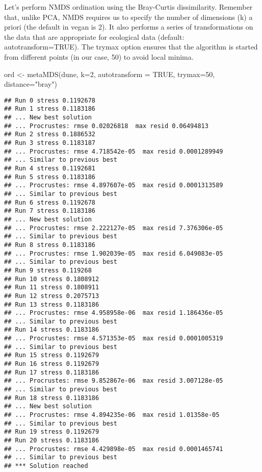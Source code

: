\documentclass[
]{book}
\newenvironment{Shaded}{\begin{snugshade}}{\end{snugshade}}
\newcommand{\AttributeTok}[1]{\textcolor[rgb]{0.77,0.63,0.00}{#1}}
\newcommand{\ConstantTok}[1]{\textcolor[rgb]{0.00,0.00,0.00}{#1}}
\newcommand{\DecValTok}[1]{\textcolor[rgb]{0.00,0.00,0.81}{#1}}
\newcommand{\FunctionTok}[1]{\textcolor[rgb]{0.00,0.00,0.00}{#1}}
\newcommand{\NormalTok}[1]{#1}
\newcommand{\OtherTok}[1]{\textcolor[rgb]{0.56,0.35,0.01}{#1}}
\newcommand{\StringTok}[1]{\textcolor[rgb]{0.31,0.60,0.02}{#1}}
\begin{document}
Let's perform NMDS ordination using the Bray-Curtis dissimilarity. Remember that, unlike PCA, NMDS requires us to specify the number of dimensions (k) a priori (the default in vegan is 2). It also performs a series of transformations on the data that are appropriate for ecological data (default: autotransform=TRUE). The trymax option ensures that the algorithm is started from different points (in our case, 50) to avoid local minima.

\begin{Shaded}
\begin{Highlighting}[]
\NormalTok{ord }\OtherTok{\textless{}{-}} \FunctionTok{metaMDS}\NormalTok{(dune, }\AttributeTok{k=}\DecValTok{2}\NormalTok{, }\AttributeTok{autotransform =} \ConstantTok{TRUE}\NormalTok{, }\AttributeTok{trymax=}\DecValTok{50}\NormalTok{, }\AttributeTok{distance=}\StringTok{"bray"}\NormalTok{)}
\end{Highlighting}
\end{Shaded}

\begin{verbatim}
## Run 0 stress 0.1192678 
## Run 1 stress 0.1183186 
## ... New best solution
## ... Procrustes: rmse 0.02026818  max resid 0.06494813 
## Run 2 stress 0.1886532 
## Run 3 stress 0.1183187 
## ... Procrustes: rmse 4.718542e-05  max resid 0.0001289949 
## ... Similar to previous best
## Run 4 stress 0.1192681 
## Run 5 stress 0.1183186 
## ... Procrustes: rmse 4.897607e-05  max resid 0.0001313589 
## ... Similar to previous best
## Run 6 stress 0.1192678 
## Run 7 stress 0.1183186 
## ... New best solution
## ... Procrustes: rmse 2.222127e-05  max resid 7.376306e-05 
## ... Similar to previous best
## Run 8 stress 0.1183186 
## ... Procrustes: rmse 1.902039e-05  max resid 6.049083e-05 
## ... Similar to previous best
## Run 9 stress 0.119268 
## Run 10 stress 0.1808912 
## Run 11 stress 0.1808911 
## Run 12 stress 0.2075713 
## Run 13 stress 0.1183186 
## ... Procrustes: rmse 4.958958e-06  max resid 1.186436e-05 
## ... Similar to previous best
## Run 14 stress 0.1183186 
## ... Procrustes: rmse 4.571353e-05  max resid 0.0001005319 
## ... Similar to previous best
## Run 15 stress 0.1192679 
## Run 16 stress 0.1192679 
## Run 17 stress 0.1183186 
## ... Procrustes: rmse 9.852867e-06  max resid 3.007128e-05 
## ... Similar to previous best
## Run 18 stress 0.1183186 
## ... New best solution
## ... Procrustes: rmse 4.894235e-06  max resid 1.01358e-05 
## ... Similar to previous best
## Run 19 stress 0.1192679 
## Run 20 stress 0.1183186 
## ... Procrustes: rmse 4.429898e-05  max resid 0.0001465741 
## ... Similar to previous best
## *** Solution reached
\end{verbatim}
\end{document}
